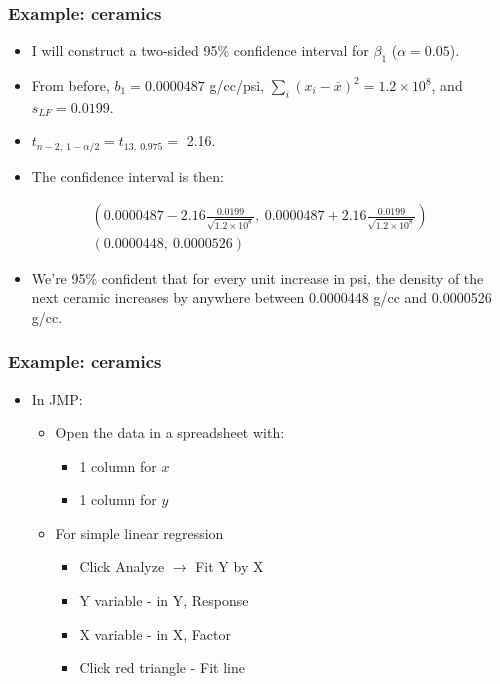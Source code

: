 \documentclass[handout]{beamer}\usepackage[]{graphicx}\usepackage[]{color}
\providecommand{\ov}[1]{\overline{#1}}
\numberwithin{equation}{section}
\begin{document}
\begin{frame}
\frametitle{Example: ceramics} \small
\begin{itemize}
\item I will construct a two-sided 95\% confidence interval for $\beta_1$ ($\alpha = 0.05$).
\pause \item From before, $b_1 = 0.0000487$ g/cc/psi, $\sum_i (x_i - \ov{x})^2 = 1.2 \times 10^8$, and $s_{LF} = 0.0199$.
\pause \item $t_{n -2, \ 1-\alpha/2} = t_{13, \ 0.975} = $ 2.16.
\pause \item The confidence interval is then:
\end{itemize}
\pause \begin{align*}
\left ( 0.0000487 - 2.16 \frac{0.0199}{\sqrt{1.2 \times 10^8}}, \ 0.0000487 + 2.16 \frac{0.0199}{\sqrt{1.2 \times 10^8}}  \right) \\
(0.0000448, \ 0.0000526)
\end{align*}
\begin{itemize}
\pause \item We're 95\% confident that for every unit increase in psi, the density of the next ceramic increases by anywhere between 0.0000448 g/cc and 0.0000526 g/cc.
\end{itemize}
\end{frame}

\begin{frame}
\frametitle{Example: ceramics}
\begin{itemize}
\item In JMP:
\begin{itemize}
\pause \item Open the data in a spreadsheet with:
\begin{itemize}
\pause \item 1 column for $x$
\pause \item 1 column for $y$
\end{itemize}
\pause \item For simple linear regression
\begin{itemize}
\pause \item Click Analyze $\rightarrow$ Fit Y by X
\pause \item Y variable - in Y, Response
\pause \item X variable - in X, Factor
\pause \item Click red triangle - Fit line
\end{itemize}
\end{itemize}
\end{itemize}
\end{frame}
\end{document}
